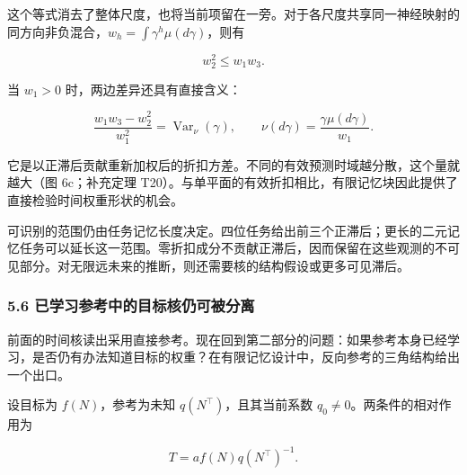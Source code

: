 \documentclass[11pt,a4paper]{article}
\begin{document}
\par
\noindent\begin{minipage}{\linewidth}

这个等式消去了整体尺度，也将当前项留在一旁。对于各尺度共享同一神经映射的同方向非负混合，\(w_h=\int\gamma^h\mu(d\gamma)\)，则有

\[
w_2^2\leq w_1w_3.
\]

\end{minipage}\par

\par
\noindent\begin{minipage}{\linewidth}

当 \(w_1>0\) 时，两边差异还具有直接含义：

\[
\frac{w_1w_3-w_2^2}{w_1^2}
=\operatorname{Var}_{\nu}(\gamma),
\qquad\nu(d\gamma)=\frac{\gamma\mu(d\gamma)}{w_1}.
\]

\end{minipage}\par

它是以正滞后贡献重新加权后的折扣方差。不同的有效预测时域越分散，这个量就越大（图
6c；补充定理
T20）。与单平面的有效折扣相比，有限记忆块因此提供了直接检验时间权重形状的机会。

可识别的范围仍由任务记忆长度决定。四位任务给出前三个正滞后；更长的二元记忆任务可以延长这一范围。零折扣成分不贡献正滞后，因而保留在这些观测的不可见部分。对无限远未来的推断，则还需要核的结构假设或更多可见滞后。

\subsubsection{5.6
已学习参考中的目标核仍可被分离}\label{ux5df2ux5b66ux4e60ux53c2ux8003ux4e2dux7684ux76eeux6807ux6838ux4ecdux53efux88abux5206ux79bb}

前面的时间核读出采用直接参考。现在回到第二部分的问题：如果参考本身已经学习，是否仍有办法知道目标的权重？在有限记忆设计中，反向参考的三角结构给出一个出口。

\par
\noindent\begin{minipage}{\linewidth}

设目标为 \(f(N)\)，参考为未知 \(q(N^\top)\)，且其当前系数
\(q_0\neq0\)。两条件的相对作用为

\[
T=af(N)q(N^\top)^{-1}.
\]

\end{minipage}\par
\end{document}
